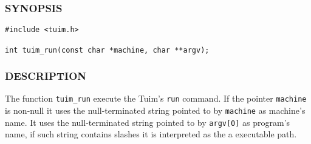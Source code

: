 \subsubsection*{SYNOPSIS}

\begin{lstlisting}[style=c]
#include <tuim.h>

int tuim_run(const char *machine, char **argv);
\end{lstlisting}

\subsubsection*{DESCRIPTION}

The function \texttt{tuim\_run} execute the Tuim's \texttt{run} command.
If the pointer \texttt{machine} is non-null it
uses the null-terminated string pointed to by
\texttt{machine} as machine's name.
It uses the null-terminated string pointed to by
\texttt{argv[0]} as program's name,
if such string contains slashes
it is interpreted as the a executable path.

